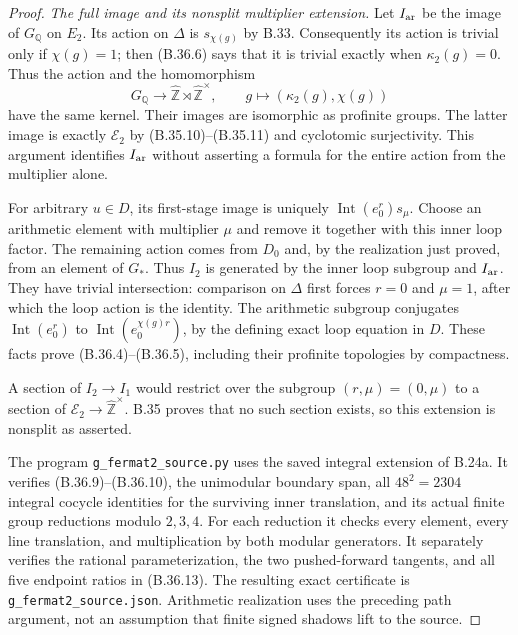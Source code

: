 \begin{proof}
\emph{The full image and its nonsplit multiplier extension.}
Let $I_{\rm ar}$ be the image of $G_{\mathbb Q}$ on $E_2$.
Its action on $\Delta$ is $s_{\chi(g)}$ by B.33.
Consequently its action is trivial only if $\chi(g)=1$;
then (B.36.6) says that it is trivial exactly when
$\kappa_2(g)=0$.  Thus the action and the homomorphism
\[
 G_{\mathbb Q}\longrightarrow
       \widehat{\mathbb Z}\rtimes\widehat{\mathbb Z}^{\times},
       \qquad g\longmapsto(\kappa_2(g),\chi(g))
\]
have the same kernel.  Their images are isomorphic as
profinite groups.  The latter image is exactly $\mathcal E_2$
by (B.35.10)--(B.35.11) and cyclotomic surjectivity.
This argument identifies $I_{\rm ar}$ without asserting a
formula for the entire action from the multiplier alone.

For arbitrary $u\in D$, its first-stage image is uniquely
$\operatorname{Int}(e_0^r)s_\mu$.  Choose an arithmetic
element with multiplier $\mu$ and remove it together with
this inner loop factor.  The remaining action comes from
$D_0$ and, by the realization just proved, from an element
of $G_*$.  Thus $I_2$ is generated by the inner loop
subgroup and $I_{\rm ar}$.  They have trivial intersection:
comparison on $\Delta$ first forces $r=0$ and $\mu=1$,
after which the loop action is the identity.
The arithmetic subgroup conjugates
$\operatorname{Int}(e_0^r)$ to
$\operatorname{Int}(e_0^{\chi(g)r})$, by the defining exact
loop equation in $D$.  These facts prove (B.36.4)--(B.36.5),
including their profinite topologies by compactness.

A section of $I_2\to I_1$ would restrict over the subgroup
$(r,\mu)=(0,\mu)$ to a section of
$\mathcal E_2\to\widehat{\mathbb Z}^{\times}$.
B.35 proves that no such section exists, so this extension
is nonsplit as asserted.

The program \texttt{g\_fermat2\_source.py} uses the saved
integral extension of B.24a.  It verifies (B.36.9)--(B.36.10),
the unimodular boundary span, all $48^2=2304$ integral
cocycle identities for the surviving inner translation,
and its actual finite group reductions modulo $2,3,4$.
For each reduction it checks every element, every line
translation, and multiplication by both modular generators.
It separately verifies the rational parameterization, the
two pushed-forward tangents, and all five endpoint ratios
in (B.36.13).  The resulting exact certificate is
\texttt{g\_fermat2\_source.json}.  Arithmetic realization
uses the preceding path argument, not an assumption that
finite signed shadows lift to the source.
\end{proof}
